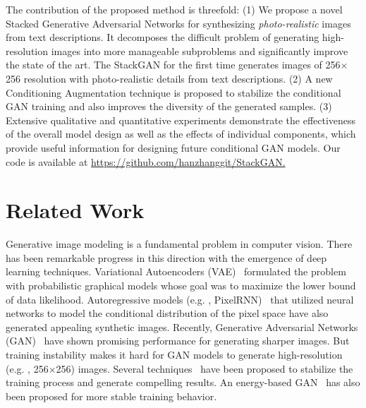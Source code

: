The contribution of the proposed method is threefold: (1) We propose a novel Stacked Generative Adversarial Networks for synthesizing \emph{photo-realistic} images from text descriptions. It decomposes the difficult problem of generating high-resolution images into more manageable subproblems and significantly improve the state of the art. The StackGAN for the first time generates images of 256$\times$256 resolution with photo-realistic details from text descriptions. (2) A new Conditioning Augmentation technique is proposed to stabilize the conditional GAN training and also improves the diversity of the generated samples. (3) Extensive qualitative and quantitative experiments demonstrate the effectiveness of the overall model design as well as the effects of individual components, which provide useful information for designing future conditional GAN models. Our code is available at {\href{https://github.com/hanzhanggit/StackGAN}{https://github.com/hanzhanggit/StackGAN.}}

\section{Related Work}

Generative image modeling is a fundamental problem in computer vision. There has been remarkable progress in this direction with the emergence of deep learning techniques. Variational Autoencoders (VAE)~\cite{KingmaW14, RezendeMW14} formulated the problem with probabilistic graphical models whose goal was to maximize the lower bound of data likelihood. Autoregressive models (e.g. , PixelRNN)~\cite{OordKK16} that utilized neural networks to model the conditional distribution of the pixel space have also generated appealing synthetic images. Recently, Generative Adversarial Networks (GAN)~\cite{goodfellow2014generative} have shown promising performance for generating sharper images. But training instability makes it hard for GAN models to generate high-resolution (e.g. , 256$\times$256) images. Several techniques~\cite{Radford15, Salimans2016, MetzICLR17, ArjovskyB17, CheLJBL16} have been proposed to stabilize the training process and generate compelling results. An energy-based GAN~\cite{Zhao2016} has also been proposed for more stable training behavior.  

